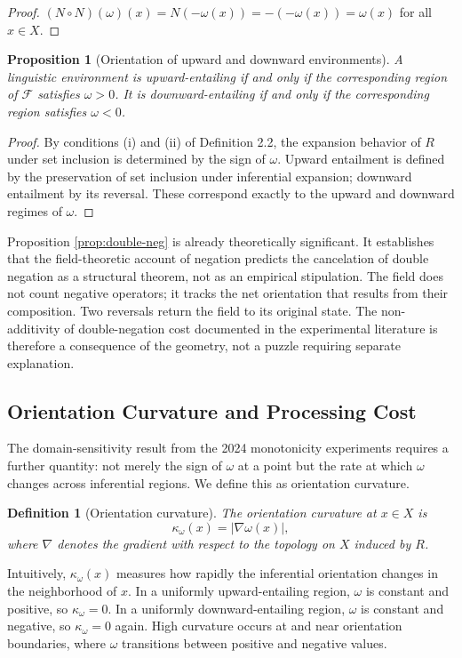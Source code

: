 \documentclass[12pt]{article}
\newtheorem{proposition}[theorem]{Proposition}
\newtheorem{definition}[theorem]{Definition}
\theoremstyle{remark}
\begin{document}
\begin{proof}
$(N \circ N)(\omega)(x) = N(-\omega(x)) = -(-\omega(x)) = \omega(x)$ for
all $x \in X$.
\end{proof}

\begin{proposition}[Orientation of upward and downward environments]
\label{prop:orientation}
A linguistic environment is upward-entailing if and only if the
corresponding region of $\mathcal{F}$ satisfies $\omega > 0$. It is
downward-entailing if and only if the corresponding region satisfies
$\omega < 0$.
\end{proposition}

\begin{proof}
By conditions (i) and (ii) of Definition 2.2, the expansion behavior of
$R$ under set inclusion is determined by the sign of $\omega$. Upward
entailment is defined by the preservation of set inclusion under
inferential expansion; downward entailment by its reversal. These
correspond exactly to the upward and downward regimes of $\omega$.
\end{proof}

Proposition \ref{prop:double-neg} is already theoretically significant.
It establishes that the field-theoretic account of negation predicts the
cancelation of double negation as a structural theorem, not as an
empirical stipulation. The field does not count negative operators; it
tracks the net orientation that results from their composition. Two
reversals return the field to its original state. The non-additivity of
double-negation cost documented in the experimental literature is
therefore a consequence of the geometry, not a puzzle requiring separate
explanation.

\subsection{Orientation Curvature and Processing Cost}

The domain-sensitivity result from the 2024 monotonicity experiments
requires a further quantity: not merely the sign of $\omega$ at a point
but the rate at which $\omega$ changes across inferential regions. We
define this as orientation curvature.

\begin{definition}[Orientation curvature]
The \emph{orientation curvature} at $x \in X$ is
\[
\kappa_\omega(x) = \left| \nabla \omega(x) \right|,
\]
where $\nabla$ denotes the gradient with respect to the topology on $X$
induced by $R$.
\end{definition}
Intuitively, $\kappa_\omega(x)$ measures how rapidly the inferential
orientation changes in the neighborhood of $x$. In a uniformly
upward-entailing region, $\omega$ is constant and positive, so
$\kappa_\omega = 0$. In a uniformly downward-entailing region, $\omega$
is constant and negative, so $\kappa_\omega = 0$ again. High curvature
occurs at and near orientation boundaries, where $\omega$ transitions
between positive and negative values.
\end{document}
